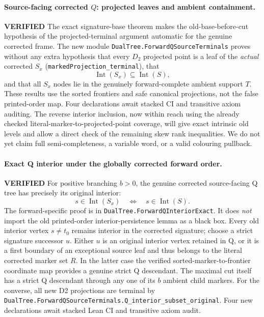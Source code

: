 \documentclass[11pt]{article}
\newcommand{\ok}{\textcolor{green!40!black}{\textbf{VERIFIED}}}
\newcommand{\lean}[1]{\texttt{#1}}
\begin{document}
\paragraph{Source-facing corrected $Q$: projected leaves and ambient containment.} \ok
The exact signature-base theorem makes the
old-base-before-cut hypothesis of the
projected-terminal argument automatic
for the genuine corrected frame.
The new module
\lean{DualTree.ForwardQSourceTerminals}
proves without any extra hypothesis that
every $D_2$ projected point is a leaf of
the \emph{actual} corrected $S_x$
(\lean{markedProjection_terminal}), that
\[
 \operatorname{Int}(S_x)\subseteq
 \operatorname{Int}(S),
\]
and that all $S_x$ nodes lie in the
genuinely forward-complete ambient support
$T$. These results use the sorted
frontiers and safe canonical projections,
not the false printed-order map.
Four declarations await stacked CI and
transitive axiom auditing.
The reverse interior inclusion, now
within reach using the already checked
literal-marker-to-projected-point
coverage, will give exact intrinsic
old levels and allow a direct check
of the remaining skew rank inequalities.
We do not yet claim full semi-completeness,
a variable word, or a valid colouring
pullback.

\paragraph{Exact Q interior under the globally corrected forward order.} \ok
For positive branching $b>0$, the genuine corrected
source-facing Q tree has precisely its original interior:
\[
   s\in\operatorname{Int}(S_x)\quad\Longleftrightarrow\quad
   s\in\operatorname{Int}(S).
\]
The forward-specific proof is in
\lean{DualTree.ForwardQInteriorExact}.
It does \emph{not} import the old printed-order
interior-persistence lemma as a black box.
Every old interior vertex $s\ne t_0$ remains
interior in the corrected signature; choose
a strict signature successor $u$. Either
$u$ is an original interior vertex retained
in Q, or it is a first boundary of an exceptional
source leaf and thus belongs to the literal
corrected marker set $R$. In the latter case
the verified sorted-marker-to-frontier
coordinate map provides a genuine strict
Q descendant. The maximal cut itself
has a strict Q descendant through any
one of its $b$ ambient child markers.
For the converse, all new D2 projections
are terminal by
\lean{DualTree.ForwardQSourceTerminals.Q_interior_subset_original}.
Four new declarations await stacked Lean CI
and transitive axiom audit.
\end{document}
